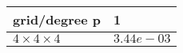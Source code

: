 \begin{tabular}{ll}
\hline
 grid/degree p         & 1          \\
\hline
 $4 \times 4 \times 4$ & $3.44e-03$ \\
\hline
\end{tabular}
